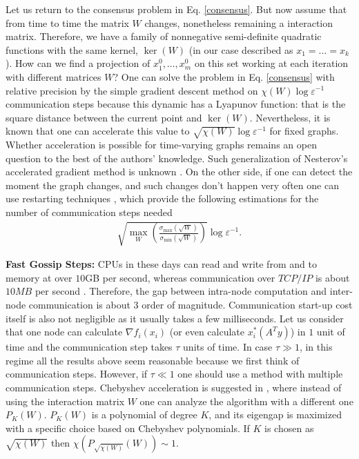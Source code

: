\documentclass[final]{siamart1116}
\numberwithin{theorem}{section}
\begin{document}
	Let us return to the consensus problem in Eq. \eqref{consensus}. But now assume that from time to time the matrix $W$ changes, nonetheless remaining a interaction matrix. Therefore, we have a family of nonnegative semi-definite quadratic functions with the same kernel, $\ker(W)$ (in our case described as $x_1 =  \hdots  = x_k$). How can we find a projection of $x_1^0,\hdots,x_m^0$ on this set working at each iteration with different matrices $W$? One can solve the problem in Eq. \eqref{consensus} with relative precision by the simple gradient descent method on $\chi(W)\log \varepsilon^{-1}$ communication steps because this dynamic has a Lyapunov function: that is the square distance between the current point and $\ker(W)$. Nevertheless, it is known that one can accelerate this value to $\sqrt{\chi(W)}\log \varepsilon^{-1}$ for fixed graphs. Whether acceleration is possible for time-varying graphs remains an open question to the best of the authors' knowledge. Such generalization of  Nesterov's accelerated gradient method is unknown \cite{nar05,bub15,all14,lin15,tay17,hu17,sun17}. On the other side, if one can detect the moment the graph changes, and such changes don't happen very often one can use restarting techniques \cite{fer16,gas17}, which provide the following estimations for the number of communication steps needed
	\begin{align*}
	\sqrt{\max_W \left( \frac{ \sigma_{\max}(\sqrt{W})}{\sigma_{\min}(\sqrt{W})}\right) } \log \varepsilon^{-1}.
	\end{align*}
	
	
	\noindent\textbf{Fast Gossip Steps:} CPUs in these days can read and write from and to memory at over $10$GB per second, whereas communication over $TCP/IP$ is about $10MB$ per second \cite{lan17}. Therefore, the gap between intra-node computation and inter-node communication is about $3$ order of magnitude. Communication start-up cost itself is also not negligible as it usually takes a few milliseconds. Let us consider that one node can calculate $\nabla f_i (x_i)$  (or even calculate $x^*_i(A^Ty)$) in $1$ unit of time and the communication step takes $\tau$ units of time. In case $\tau \gg 1$, in this regime all the results above seem reasonable because we first think of communication steps. However, if $\tau \ll 1$ one should use a method with multiple communication steps. Chebyshev acceleration is suggested in \cite{sca17}, where instead of using the interaction matrix $W$ one can analyze the algorithm with a different one $P_K(W)$. $P_K(W)$ is a polynomial of degree $K$, and its eigengap is maximized with a specific choice based on Chebyshev polynomials. If $K$ is chosen as $\sqrt{\chi(W)}$ then \mbox{$\chi\left( P_{\sqrt{\chi(W)}}(W)\right)  \sim 1$}.
	
\end{document}

